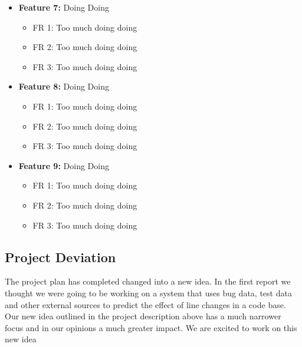\documentclass[11pt,]{article}
\providecommand{\tightlist}{%
  \setlength{\itemsep}{0pt}\setlength{\parskip}{0pt}}
\begin{document}
\begin{itemize}
\tightlist
\item
  \textbf{Feature 7:} Doing Doing

  \begin{itemize}
  \tightlist
  \item
    FR 1: Too much doing doing
  \item
    FR 2: Too much doing doing
  \item
    FR 3: Too much doing doing
  \end{itemize}
\item
  \textbf{Feature 8:} Doing Doing

  \begin{itemize}
  \tightlist
  \item
    FR 1: Too much doing doing
  \item
    FR 2: Too much doing doing
  \item
    FR 3: Too much doing doing
  \end{itemize}
\item
  \textbf{Feature 9:} Doing Doing

  \begin{itemize}
  \tightlist
  \item
    FR 1: Too much doing doing
  \item
    FR 2: Too much doing doing
  \item
    FR 3: Too much doing doing
  \end{itemize}
\end{itemize}

\hypertarget{project-deviation}{%
\subsection{Project Deviation}\label{project-deviation}}

The project plan has completed changed into a new idea. In the first
report we thought we were going to be working on a system that uses bug
data, test data and other external sources to predict the effect of line
changes in a code base. Our new idea outlined in the project description
above has a much narrower focus and in our opinions a much greater
impact. We are excited to work on this new idea
\end{document}
